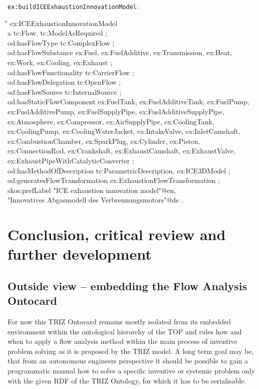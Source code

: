 \documentclass[a4paper,11pt]{article}
\newenvironment{code}{\tt \begin{tabbing}
\hskip12pt\=\hskip12pt\=\hskip12pt\=\hskip12pt\=\hskip5cm\=\hskip5cm\=\kill}
{\end{tabbing}}
\begin{document}
\texttt{ex:buildICEExhaustionInnovationModel}:
\begin{code}
ex:ICEExhaustionInnovationModel \\
\> a tc:Flow, tc:ModelAsRequired ; \\
\> od:hasFlowType tc:ComplexFlow ; \\
\> od:hasFlowSubstance ex:Fuel, ex:FuelAdditive, ex:Transmission, ex:Heat,  \\
\>\> ex:Work, ex:Cooling, ex:Exhaust ; \\
\> od:hasFlowFunctionality tc:CarrierFlow ; \\
\> od:hasFlowDelegation tc:OpenFlow ; \\
\> od:hasFlowSource tc:InternalSource ; \\
\> od:hasStaticFlowComponent ex:FuelTank, ex:FuelAdditiveTank, ex:FuelPump,
\+\\ 
\> ex:FuelAdditivePump, ex:FuelSupplyPipe, ex:FuelAdditiveSupplyPipe, \\
\> ex:Atmosphere, ex:Compressor, ex:AirSupplyPipe, ex:CoolingTank, \\
\> ex:CoolingPump, ex:CoolingWaterJacket, ex:IntakeValve, ex:InletCamshaft,\\
\> ex:CombustionChamber, ex:SparkPlug, ex:Cylinder, ex:Piston, \\
\> ex:ConnectionRod, ex:Crankshaft, ex:ExhaustCamshaft, ex:ExhaustValve,\\
\> ex:ExhaustPipeWithCatalyticConverter ; \-\\
\> od:hasMethodOfDescription tc:ParametricDescription, ex:ICE3DModel ; \\
\> od:generatesFlowTransformation ex:ExhaustionFlowTransformation ; \\
\> skos:prefLabel "ICE exhaustion innovation model"@en,\\
\>\> "Innovatives Abgasmodell des Verbrennungsmotors"@de . 
\end{code}

\section{Conclusion, critical review and further development}

\subsection{Outside view -- embedding the Flow Analysis Ontocard}

For now this TRIZ Ontocard remains mostly isolated from its embedded
environment within the ontological hierarchy of the TOP and rules how and when
to apply a flow analysis method within the main process of inventive problem
solving as it is proposed by the TRIZ model. A long term goal may be, that
from an autonomous engineers perspective it should be possible to gain a
programmatic manual how to solve a specific inventive or systemic problem only
with the given RDF of the TRIZ Ontology, for which it has to be serialisable.
\end{document}
